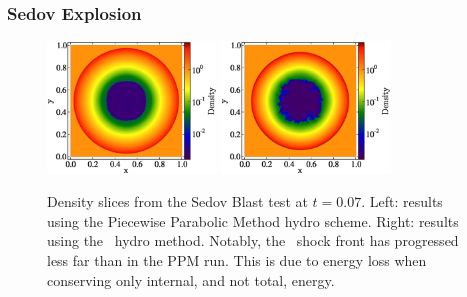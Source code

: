 \subsubsection{Sedov Explosion}
\label{sec.tests.sedov}

\begin{figure}
\begin{center}
\includegraphics[width=0.4\textwidth]{figures/sedov-ppm-slice.eps}
\includegraphics[width=0.4\textwidth]{figures/sedov-zeus-slice.eps}
\caption{Density slices from the Sedov Blast test at $t = 0.07$. Left:
results using the Piecewise Parabolic Method hydro scheme.  Right: results using the \zeus\
hydro method. Notably, the \zeus\ shock front has progressed less far
than in the PPM run. This is due to energy loss when conserving only
internal, and not total, energy.}
\label{fig.sedov1}
\end{center}
\end{figure}


